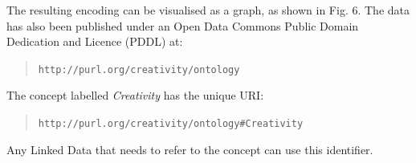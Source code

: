 \documentclass[10pt,letterpaper]{article}
\begin{document}
The resulting encoding can be visualised as a graph, as shown in Fig. 6. %
The data has also been published under an Open Data Commons Public Domain Dedication and Licence (PDDL) \cite{miller08} at:
\begin{quote}
\texttt{\scriptsize http://purl.org/creativity/ontology}
\end{quote}
The concept labelled {\em Creativity} has the unique URI: 
\begin{quote}
\texttt{\scriptsize http://purl.org/creativity/ontology\#Creativity}
\end{quote}%
Any Linked Data that needs to refer to the concept can use this identifier. 









\end{document}
